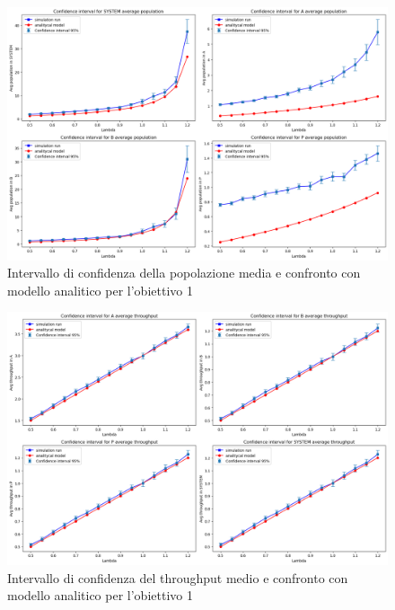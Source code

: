 \begin{figure}
    \centering
    \includegraphics[width=\textwidth]{figs//results/obj1/obj1-line-population.png}
    \caption{Intervallo di confidenza della popolazione media e confronto con modello analitico per l'obiettivo 1}
    \label{fig:obj1_line_population}
\end{figure}
\begin{figure}
    \centering
    \includegraphics[width=\textwidth]{figs//results/obj1/obj1-line-throughput.png}
    \caption{Intervallo di confidenza del throughput medio e confronto con modello analitico per l'obiettivo 1}
    \label{fig:obj1_line_throughput}
\end{figure}

